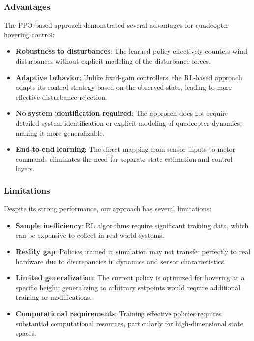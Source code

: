 \documentclass[12pt]{article}
\begin{document}
\subsubsection{Advantages}
The PPO-based approach demonstrated several advantages for quadcopter hovering control:

\begin{itemize}
    \item \textbf{Robustness to disturbances}: The learned policy effectively counters wind disturbances without explicit modeling of the disturbance forces.
    
    \item \textbf{Adaptive behavior}: Unlike fixed-gain controllers, the RL-based approach adapts its control strategy based on the observed state, leading to more effective disturbance rejection.
    
    \item \textbf{No system identification required}: The approach does not require detailed system identification or explicit modeling of quadcopter dynamics, making it more generalizable.
    
    \item \textbf{End-to-end learning}: The direct mapping from sensor inputs to motor commands eliminates the need for separate state estimation and control layers.
\end{itemize}

\subsubsection{Limitations}
Despite its strong performance, our approach has several limitations:

\begin{itemize}
    \item \textbf{Sample inefficiency}: RL algorithms require significant training data, which can be expensive to collect in real-world systems.
    
    \item \textbf{Reality gap}: Policies trained in simulation may not transfer perfectly to real hardware due to discrepancies in dynamics and sensor characteristics.
    
    \item \textbf{Limited generalization}: The current policy is optimized for hovering at a specific height; generalizing to arbitrary setpoints would require additional training or modifications.
    
    \item \textbf{Computational requirements}: Training effective policies requires substantial computational resources, particularly for high-dimensional state spaces.
\end{itemize}
\end{document}
